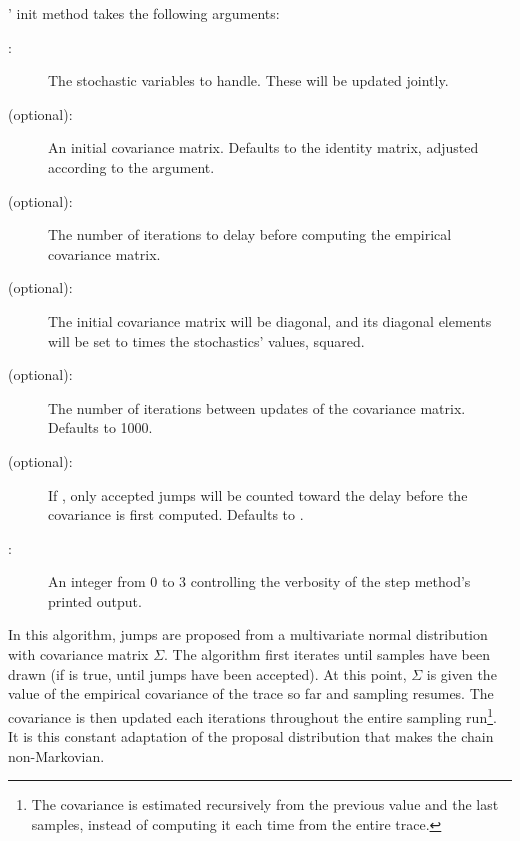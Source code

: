 ' init method takes the following arguments:
\begin{description}
   \item[:] The stochastic variables to handle. These will be updated jointly.
   \item[ (optional):] An initial covariance matrix. Defaults to the identity matrix, adjusted according to the  argument. 
   \item[ (optional):] The number of iterations to delay before computing the empirical covariance matrix.
   \item[ (optional):] The initial covariance matrix will be diagonal, and its diagonal elements will be set to  times the stochastics' values, squared.
   \item[ (optional):] The number of iterations between updates of the covariance matrix. Defaults to 1000.
   \item[ (optional):] If , only accepted jumps will be counted toward the delay before the covariance is first computed. Defaults to . 
   \item[:] An integer from 0 to 3 controlling the verbosity of the step method's printed output.   
\end{description}
 
In this algorithm, jumps are proposed from a multivariate normal
distribution with covariance matrix $\Sigma$. The algorithm first iterates
until  samples have been drawn (if  is true, until
 jumps have been accepted). At this point, $\Sigma$ is given 
the value of the empirical covariance of the trace so far and sampling
resumes. The covariance is then updated each 
iterations throughout the entire sampling run\footnote{The covariance is
estimated recursively from the previous value and the last 
samples, instead of computing it each time from the entire trace.}. It is
this constant adaptation of the proposal distribution that makes the chain
non-Markovian. 

